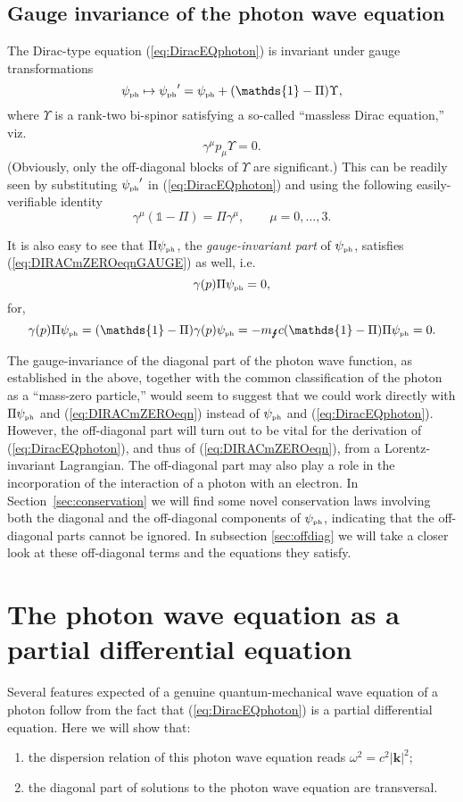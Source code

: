 \documentclass[12pt]{article}
\theoremstyle{definition}
\newcommand{\refeq}[1]{(\ref{#1})}
\newcommand{\vect}[1] {\boldsymbol{{ #1}} }
\newcommand{\kV}{{\vect{k}}}		%
\numberwithin{equation}{section}
\newcommand{\beq}{\begin{equation}}
\newcommand{\eeq}{\end{equation}}
\newcommand{\Id}{\mathds{1}}
\newcommand{\psiPH}{{\psi_{\mbox{\rm\tiny ph}}}}
\newcommand{\mPH}{{m_{\mbox{\Lightning}}}}
\newcommand{\ga}{\gamma}
\begin{document}
\subsection{Gauge invariance of the photon wave equation}\label{sec:gaugeinv}
%
 The Dirac-type equation \refeq{eq:DiracEQphoton} is invariant under gauge transformations 
\beq \label{gaugetrans}
\psiPH \mapsto \psiPH' = \psiPH + (\Id - \Pi) \Upsilon,
\eeq
where $\Upsilon$ is a rank-two bi-spinor satisfying a so-called ``massless Dirac equation,'' viz.
\beq \label{eq:DIRACmZEROeqnGAUGE}
\ga^\mu p_\mu \Upsilon = 0.
\eeq
(Obviously, only the off-diagonal blocks of $\Upsilon$ are significant.)  
This can be readily seen by substituting $\psiPH'$ in \refeq{eq:DiracEQphoton} and using the following easily-verifiable identity
\beq \label{iden:gaPi}
\ga^\mu (\Id - \Pi) = \Pi \ga^\mu,\qquad \mu = 0,\dots,3.
\eeq

 It is also easy to see that $\Pi\psiPH$, the {\em gauge-invariant part} of $\psiPH$, satisfies \refeq{eq:DIRACmZEROeqnGAUGE} as well, i.e.
\beq \label{eq:DIRACmZEROeqn}
\ga(p)\Pi\psiPH = 0, 
\eeq
for,
\beq 
\ga(p)\Pi\psiPH = (\Id-\Pi)\ga(p)\psiPH =- \mPH c(\Id - \Pi)\Pi\psiPH = 0.
\eeq

 The gauge-invariance of the diagonal part of the photon wave function, as established in the above,  together with the common 
classification of the photon as a ``mass-zero particle,'' 
would seem to suggest that we could work directly with $\Pi\psiPH$ and \refeq{eq:DIRACmZEROeqn} instead of
 $\psiPH$ and \refeq{eq:DiracEQphoton}.
 However, the off-diagonal part will turn out to be vital for the derivation of \refeq{eq:DiracEQphoton}, and thus of \refeq{eq:DIRACmZEROeqn},
from a Lorentz-invariant Lagrangian.
 The off-diagonal part may also play a role in the incorporation of the interaction of a photon with an electron. 
In Section~\ref{sec:conservation} we will find some novel conservation laws involving both the diagonal and the off-diagonal components 
of $\psiPH$, indicating that the off-diagonal parts cannot be ignored. In subsection \ref{sec:offdiag} we will take a closer look at 
these off-diagonal terms and the equations they satisfy.  
\section{The photon wave equation as a partial differential equation}\label{sec:PDE}
%
 Several features expected of a genuine quantum-mechanical wave equation of a photon follow from the fact that \refeq{eq:DiracEQphoton}
is a partial differential equation. 
 Here we will show that:
\begin{enumerate}
\item 
the dispersion relation of this photon wave equation reads $\omega^2 =  c^2|\kV|^2$;
\item
the diagonal part of solutions to the photon wave equation are transversal.
\end{enumerate}
\end{document}
